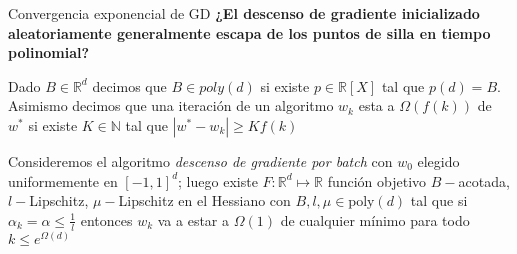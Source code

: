 \documentclass{beamer}
\newcommand{\R}{{\mathbb{R}}}
\newcommand{\N}{{\mathbb{N}}}
\newcommand{\abs}[1]{\left\lvert#1\right\rvert}
\begin{document}
\begin{frame}{Convergencia exponencial de GD}
\textbf{¿El descenso de gradiente inicializado aleatoriamente generalmente escapa de los puntos de silla en tiempo polinomial?}

\pause

\begin{definition}
	Dado $B \in \R^d$ decimos que $B \in poly(d)$ si existe $p \in \R[X]$ tal que $p(d) = B$.
	Asimismo decimos que una iteraci\'on de un algoritmo $w_k$ esta a $\Omega(f(k))$ de $w^*$ si existe $K \in \N$ tal que $\abs{w^* - w_k} \geq Kf(k)$
\end{definition}

\pause

\begin{theorem}
	Consideremos el algoritmo \textit{descenso de gradiente por batch} con $w_0$ elegido uniformemente en $[-1,1]^d$; luego existe $F : \R^d \mapsto \R$ funci\'on objetivo $B-$acotada, $l-$Lipschitz, $\mu-$Lipschitz en el Hessiano con $B,l,\mu \in \text{poly}(d)$ tal que si $\alpha_k = \alpha \leq \frac{1}{l}$ entonces $w_k$ va a estar a $\Omega(1)$ de cualquier m\'inimo para todo $k \leq e^{\Omega(d)}$
\end{theorem}

\end{frame}
\end{document}
